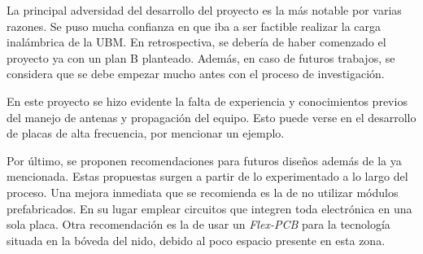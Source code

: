 La principal adversidad del desarrollo del proyecto es la más notable por varias razones. Se puso mucha confianza en que iba a ser factible realizar la carga inalámbrica de la UBM. En retrospectiva, se debería de haber comenzado el proyecto ya con un plan B planteado. Además, en caso de futuros trabajos, se considera que se debe empezar mucho antes con el proceso de investigación. 

En este proyecto se hizo evidente la falta de experiencia y conocimientos previos del manejo de antenas y propagación del equipo. Esto puede verse en el desarrollo de placas de alta frecuencia, por mencionar un ejemplo.

Por último, se proponen recomendaciones para futuros diseños además de la ya mencionada. Estas propuestas surgen a partir de lo experimentado a lo largo del proceso. Una mejora inmediata que se recomienda es la de no utilizar módulos prefabricados. En su lugar emplear circuitos que integren toda electrónica en una sola placa. Otra recomendación es la de usar un \textit{Flex-PCB} para la tecnología situada en la bóveda del nido, debido al poco espacio presente en esta zona.
